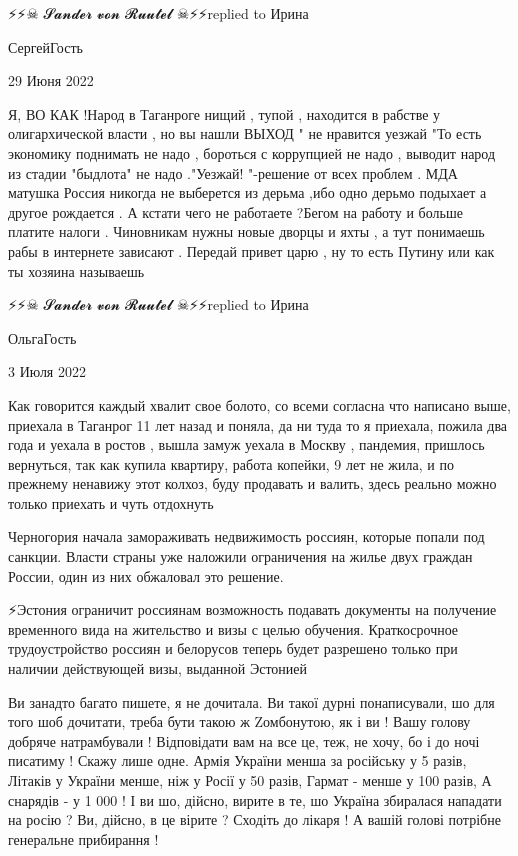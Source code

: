 ⚡⚡☠ 𝓢𝓪𝓷𝓭𝓮𝓻 𝓿𝓸𝓷 𝓡𝓾𝓾𝓽𝓮𝓵 ☠⚡⚡replied to Ирина

СергейГость

29 Июня 2022

Я, ВО КАК !Народ в Таганроге нищий , тупой , находится в рабстве у
олигархической власти , но вы нашли ВЫХОД " не нравится уезжай "То есть
экономику поднимать не надо , бороться с коррупцией не надо , выводит народ из
стадии "быдлота" не надо ."Уезжай! "-решение от всех проблем . МДА матушка
Россия никогда не выберется из дерьма ,ибо одно дерьмо подыхает а другое
рождается . А кстати чего не работаете ?Бегом на работу и больше платите налоги
. Чиновникам нужны новые дворцы и яхты , а тут понимаешь рабы в интернете
зависают . Передай привет царю , ну то есть Путину или как ты хозяина называешь

⚡⚡☠ 𝓢𝓪𝓷𝓭𝓮𝓻 𝓿𝓸𝓷 𝓡𝓾𝓾𝓽𝓮𝓵 ☠⚡⚡replied to Ирина

ОльгаГость

3 Июля 2022

Как говорится каждый хвалит свое болото, со всеми согласна что написано выше,
приехала в Таганрог 11 лет назад и поняла, да ни туда то я приехала, пожила два
года и уехала в ростов , вышла замуж уехала в Москву , пандемия, пришлось
вернуться, так как купила квартиру, работа копейки, 9 лет не жила, и по
прежнему ненавижу этот колхоз, буду продавать и валить, здесь реально можно
только приехать и чуть отдохнуть

️Черногория начала замораживать недвижимость россиян, которые попали под
санкции. Власти страны уже наложили ограничения на жилье двух граждан России,
один из них обжаловал это решение.

⚡️Эстония ограничит россиянам возможность подавать документы на получение
временного вида на жительство и визы с целью обучения. Краткосрочное
трудоустройство россиян и белорусов теперь будет разрешено только при наличии
действующей визы, выданной Эстонией

Ви занадто багато пишете, я не дочитала.
Ви такої дурні понаписували, шо для того шоб дочитати, треба бути такою ж Zомбонутою, як і ви !
Вашу голову добряче натрамбували !
Відповідати вам на все це, теж, не хочу, бо і до ночі писатиму !
Скажу лише одне.
Армія України менша за російську у 5 разів,
Літаків у України менше, ніж у Росії у 50 разів,
Гармат - менше у 100 разів,
А снарядів - у 1 000 !
І ви шо, дійсно, вирите в те, шо Україна збиралася нападати на росію ?
Ви, дійсно, в це вірите ?
Сходіть до лікаря !
А вашій голові потрібне генеральне прибирання !

